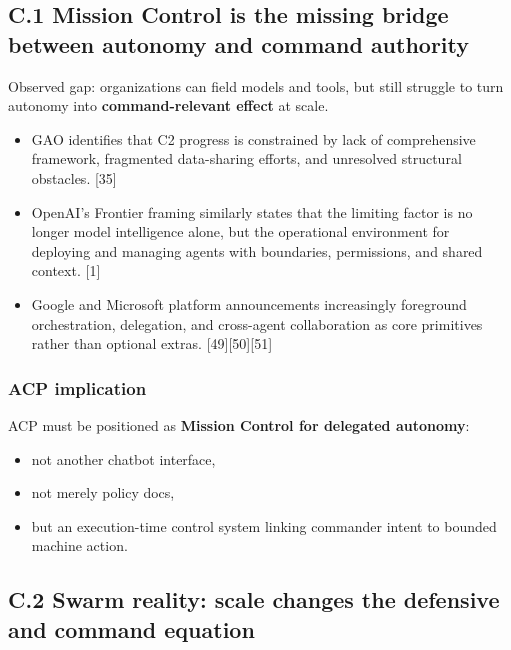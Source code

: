 \documentclass[
]{article}
\providecommand{\tightlist}{%
  \setlength{\itemsep}{0pt}\setlength{\parskip}{0pt}}
\begin{document}
\hypertarget{c.1-mission-control-is-the-missing-bridge-between-autonomy-and-command-authority}{%
\subsection{C.1 Mission Control is the missing bridge between autonomy
and command
authority}\label{c.1-mission-control-is-the-missing-bridge-between-autonomy-and-command-authority}}

Observed gap: organizations can field models and tools, but still
struggle to turn autonomy into \textbf{command-relevant effect} at
scale.

\begin{itemize}
\tightlist
\item
  GAO identifies that C2 progress is constrained by lack of
  comprehensive framework, fragmented data-sharing efforts, and
  unresolved structural obstacles. {[}35{]}
\item
  OpenAI's Frontier framing similarly states that the limiting factor is
  no longer model intelligence alone, but the operational environment
  for deploying and managing agents with boundaries, permissions, and
  shared context. {[}1{]}
\item
  Google and Microsoft platform announcements increasingly foreground
  orchestration, delegation, and cross-agent collaboration as core
  primitives rather than optional extras. {[}49{]}{[}50{]}{[}51{]}
\end{itemize}

\hypertarget{acp-implication}{%
\subsubsection{ACP implication}\label{acp-implication}}

ACP must be positioned as \textbf{Mission Control for delegated
autonomy}:

\begin{itemize}
\tightlist
\item
  not another chatbot interface,
\item
  not merely policy docs,
\item
  but an execution-time control system linking commander intent to
  bounded machine action.
\end{itemize}

\hypertarget{c.2-swarm-reality-scale-changes-the-defensive-and-command-equation}{%
\subsection{C.2 Swarm reality: scale changes the defensive and command
equation}\label{c.2-swarm-reality-scale-changes-the-defensive-and-command-equation}}
\end{document}
